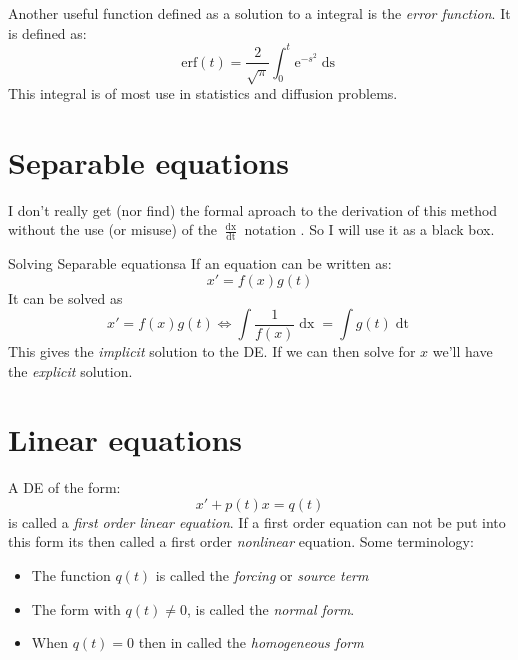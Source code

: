 \documentclass[../ode.tex]{subfiles}
\begin{document}
    Another useful function defined as a solution to a integral is the \emph{error function}. It is defined as:
    \begin{equation*}
        \mathrm{erf}(t) = \frac{2}{\sqrt{\pi}} \int_{0}^{t} \mathrm{e}^{-s ^{2}}\mathop{\mathrm{d}s}
    \end{equation*}
    This integral is of most use in statistics and diffusion problems.

    \section{\sffamily Separable equations}
    I don't really get (nor find) the formal aproach to the derivation of this method without the use (or misuse) of the
    $\frac{\mathop{\mathrm{d}x}}{\mathop{\mathrm{d}t}}$ notation . So I will use it as a black box.
    
    \begin{prop}{Solving Separable equations}{a}
        If an equation can be written as:
        \begin{equation*}
            x' = f(x)g(t)
        \end{equation*}
        It can be solved as
        \begin{equation*}
            x' = f(x)g(t) \iff \int \frac{1}{f(x)}\mathop{\mathrm{d}x} = \int g(t) \mathop{\mathrm{d}t}
        \end{equation*}
        This gives the \emph{implicit} solution to the DE. If we can then solve for $x$ we'll have the \emph{explicit} solution.
    \end{prop}
    \section{\sffamily Linear equations}
    A DE of the form:
    \begin{equation*}
        x' + p(t)x = q(t)
    \end{equation*}
    is called a \emph{first order linear equation}. If a first order equation can not be put into this form its then called a 
    first order \emph{nonlinear} equation. Some terminology:
    
    \begin{itemize}
        \item The function $q(t)$ is called the \emph{forcing} or \emph{source term}
        \item The form with $q(t) \neq 0$, is called the \emph{normal form}.
        \item When $q(t) = 0$ then in called the \emph{homogeneous form}
    \end{itemize}    
\end{document}
